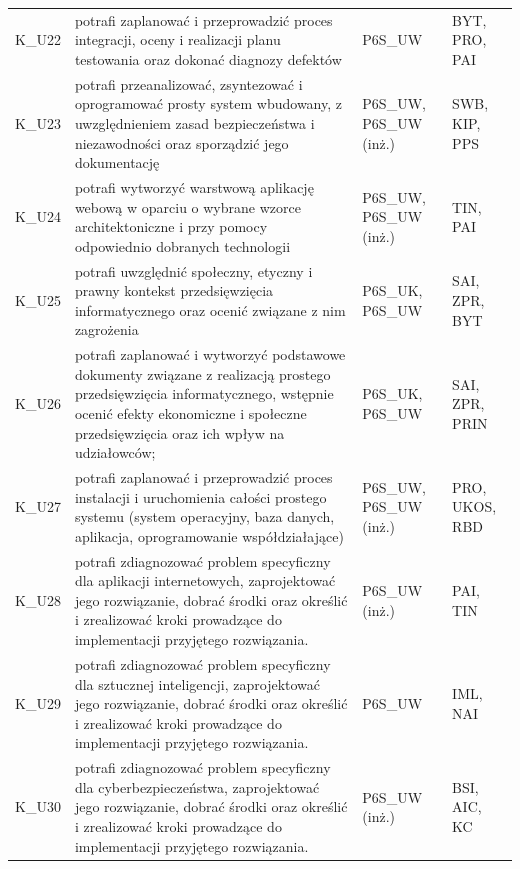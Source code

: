 \documentclass[12pt,a4paper]{article}
\begin{document}
{\begin{longtable}{m{1cm}m{8.8cm}m{2.1cm}m{2.5cm}}
\rowcolor{tableRowAlt} K\_U22 & potrafi zaplanować i przeprowadzić proces integracji, oceny i realizacji planu testowania oraz dokonać diagnozy defektów & {\scriptsize P6S\_UW} & {\scriptsize BYT, PRO, PAI} \\
\rowcolor{tableRowLight} K\_U23 & potrafi przeanalizować, zsyntezować i oprogramować prosty system wbudowany, z uwzględnieniem zasad bezpieczeństwa i niezawodności oraz sporządzić jego dokumentację & {\scriptsize P6S\_UW, P6S\_UW {\scriptsize (inż.)}} & {\scriptsize SWB, KIP, PPS} \\
\rowcolor{tableRowAlt} K\_U24 & potrafi wytworzyć warstwową aplikację webową w oparciu o wybrane wzorce architektoniczne i przy pomocy odpowiednio dobranych technologii & {\scriptsize P6S\_UW, P6S\_UW {\scriptsize (inż.)}} & {\scriptsize TIN, PAI} \\
\rowcolor{tableRowLight} K\_U25 & potrafi uwzględnić społeczny, etyczny i prawny kontekst przedsięwzięcia informatycznego oraz ocenić związane z nim zagrożenia & {\scriptsize P6S\_UK, P6S\_UW} & {\scriptsize SAI, ZPR, BYT} \\
\rowcolor{tableRowAlt} K\_U26 & potrafi zaplanować i wytworzyć podstawowe dokumenty związane z realizacją prostego przedsięwzięcia informatycznego, wstępnie ocenić efekty ekonomiczne i społeczne przedsięwzięcia oraz ich wpływ na udziałowców; & {\scriptsize P6S\_UK, P6S\_UW} & {\scriptsize SAI, ZPR, PRIN} \\
\rowcolor{tableRowLight} K\_U27 & potrafi zaplanować i przeprowadzić proces instalacji i uruchomienia całości prostego systemu (system operacyjny, baza danych, aplikacja, oprogramowanie współdziałające) & {\scriptsize P6S\_UW, P6S\_UW {\scriptsize (inż.)}} & {\scriptsize PRO, UKOS, RBD} \\
\rowcolor{tableRowAlt} K\_U28 & potrafi zdiagnozować problem specyficzny dla aplikacji internetowych, zaprojektować jego rozwiązanie, dobrać środki oraz określić i zrealizować kroki prowadzące do implementacji przyjętego rozwiązania. & {\scriptsize P6S\_UW {\scriptsize (inż.)}} & {\scriptsize PAI, TIN} \\
\rowcolor{tableRowLight} K\_U29 & potrafi zdiagnozować problem specyficzny dla sztucznej inteligencji, zaprojektować jego rozwiązanie, dobrać środki oraz określić i zrealizować kroki prowadzące do implementacji przyjętego rozwiązania. & {\scriptsize P6S\_UW} & {\scriptsize IML, NAI} \\
\rowcolor{tableRowAlt} K\_U30 & potrafi zdiagnozować problem specyficzny dla cyberbezpieczeństwa, zaprojektować jego rozwiązanie, dobrać środki oraz określić i zrealizować kroki prowadzące do implementacji przyjętego rozwiązania. & {\scriptsize P6S\_UW {\scriptsize (inż.)}} & {\scriptsize BSI, AIC, KC} \\

\end{longtable}}
\end{document}

